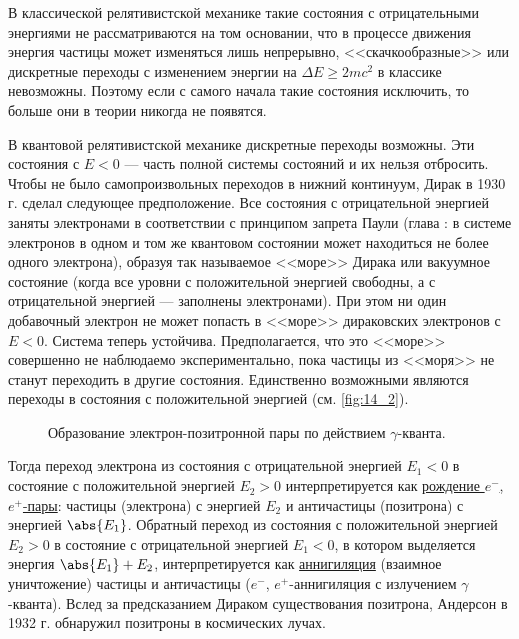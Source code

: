 В классической релятивистской механике такие состояния с отрицательными энергиями не рассматриваются на том основании, что в процессе движения энергия частицы может изменяться лишь непрерывно, <<скачкообразные>> или дискретные переходы с изменением энергии на $\Delta E \ge 2mc^2$ в классике невозможны. Поэтому если с самого начала такие состояния исключить, то больше они в теории никогда не появятся.

В квантовой релятивистской механике дискретные переходы возможны. Эти состояния с $E< 0$ --- часть полной системы состояний и их нельзя отбросить. Чтобы не было самопроизвольных переходов в нижний континуум, Дирак в 1930 г. сделал следующее предположение. Все состояния с отрицательной энергией заняты электронами в соответствии с принципом запрета Паули (глава : в системе электронов в одном и том же квантовом состоянии может находиться не более одного электрона), образуя так называемое <<море>> Дирака или вакуумное состояние (когда все уровни с положительной энергией свободны, а с отрицательной энергией --- заполнены электронами). При этом ни один добавочный электрон не может попасть в <<море>> дираковских электронов с $E<0$. Система теперь устойчива. Предполагается, что это <<море>> совершенно не наблюдаемо экспериментально, пока частицы из <<моря>> не станут переходить в другие состояния. Единственно возможными являются переходы в состояния с положительной энергией (см. \autoref{fig:14_2}).

\begin{figure}[h!]
\centering
{}
\caption{Образование электрон-позитронной пары по действием $\gamma$-кванта. } \label{fig:14_2}
\end{figure}

Тогда переход электрона из состояния с отрицательной энергией $E_1 < 0$ в состояние с положительной энергией $E_2 > 0$ интерпретируется как \underline{рождение $e^-$, $e^+$-пары}: частицы (электрона) с энергией $E_2$ и античастицы (позитрона) с энергией $\abs{E_1}$. Обратный переход из состояния с положительной энергией $E_2 > 0$ в состояние с отрицательной энергией $E_1 < 0$, в котором выделяется энергия $\abs{E_1} + E_2$, интерпретируется как \underline{аннигиляция} (взаимное уничтожение) частицы и античастицы ($e^-$, $e^+$-аннигиляция с излучением $\gamma$-кванта). Вслед за предсказанием Дираком существования позитрона, Андерсон в 1932 г. обнаружил позитроны в космических лучах.

